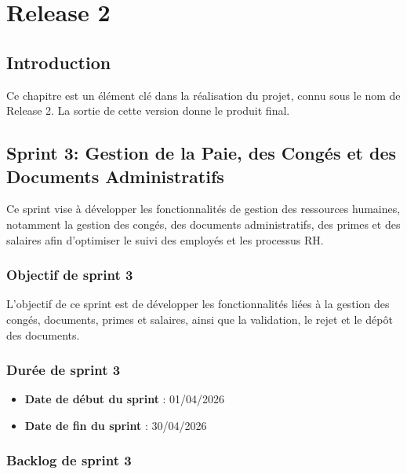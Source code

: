 \chapter{Release 2} 

\newpage

\section{Introduction}
Ce chapitre est un élément clé dans la réalisation du projet, connu sous le nom de Release 2.
La sortie de cette version donne le produit final.

\section{Sprint 3: Gestion de la Paie, des Congés et des Documents Administratifs}

Ce sprint vise à développer les fonctionnalités de gestion des ressources humaines, notamment la gestion des congés, des documents administratifs, des primes et des salaires afin d'optimiser le suivi des employés et les processus RH.

\subsection{Objectif de sprint 3}
L'objectif de ce sprint est de développer les fonctionnalités liées
à la gestion des congés, documents,
primes et salaires, ainsi que la validation, le rejet et le dépôt des documents.

\subsection{Durée de sprint 3}
\begin{itemize}
    \item \textbf{Date de début du sprint} : 01/04/2026
    \item \textbf{Date de fin du sprint} : 30/04/2026
\end{itemize}

\subsection{Backlog de sprint 3}

